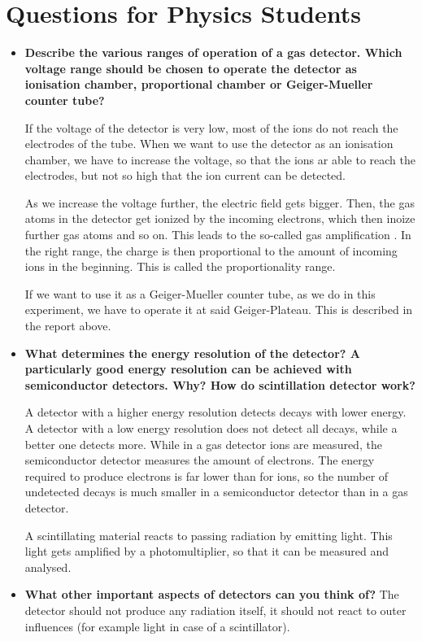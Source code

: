 \section{Questions for Physics Students}

\begin{itemize}
	\item \textbf{Describe the various ranges of operation of a gas
		detector. Which voltage range should be chosen
		to operate the detector as ionisation chamber,
		proportional chamber or Geiger-Mueller counter tube?}
	
	If the voltage of the detector is very low, most of the ions do not reach the electrodes of the tube.
	When we want to use the detector as an ionisation chamber, we have to increase the voltage, so that the ions ar able to reach the electrodes, but not so high that the ion current can be detected. 
	
	As we increase the voltage further, the electric field gets bigger.
	Then, the gas atoms in the detector get ionized by the incoming electrons, which then inoize further gas atoms and so on.
	This leads to the so-called gas amplification \cite{manual}.
	In the right range, the charge is then proportional to the amount of incoming ions in the beginning.
	This is called the proportionality range.
	
	If we want to use it as a Geiger-Mueller counter tube, as we do in this experiment, we have to operate it at said Geiger-Plateau.
	This is described in the report above. 
	
	\item \textbf{What determines the energy resolution of the
		detector? A particularly good energy resolution
		can be achieved with semiconductor detectors.
		Why? How do scintillation detector work?}
	
	A detector with a higher energy resolution detects decays with lower energy.
	A detector with a low energy resolution does not detect all decays, while a better one detects more.
	While in a gas detector ions are measured, the semiconductor detector measures the amount of electrons.
	The energy required to produce electrons is far lower than for ions, so the number of undetected decays is much smaller in a semiconductor detector than in a gas detector.
	
	A scintillating material reacts to passing radiation by emitting light.
	This light gets amplified by a photomultiplier, so that it can be measured and analysed.
	
	\item \textbf{What other important aspects of detectors can
		you think of?}
	The detector should not produce any radiation itself, it should not react to outer influences (for example light in case of a scintillator).
	

\end{itemize}
